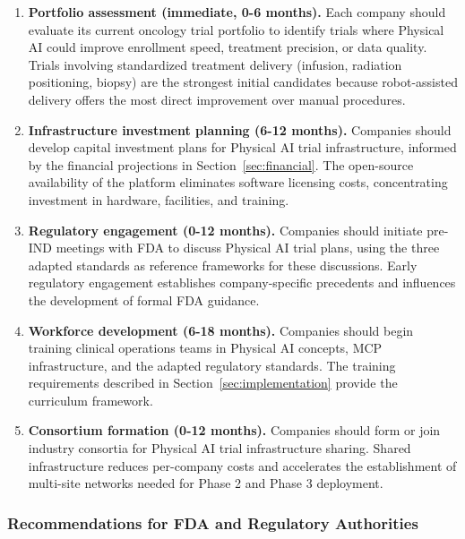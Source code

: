\begin{enumerate}[nosep]
  \item \textbf{Portfolio assessment (immediate, 0-6 months).} Each company
    should evaluate its current oncology trial portfolio to identify trials
    where Physical AI could improve enrollment speed, treatment precision, or
    data quality. Trials involving standardized treatment delivery (infusion,
    radiation positioning, biopsy) are the strongest initial candidates
    because robot-assisted delivery offers the most direct improvement over
    manual procedures.

  \item \textbf{Infrastructure investment planning (6-12 months).} Companies
    should develop capital investment plans for Physical AI trial
    infrastructure, informed by the financial projections in
    Section~\ref{sec:financial}. The open-source availability of the platform
    \cite{main-repo, mcp-repo, fl-repo} eliminates software licensing costs,
    concentrating investment in hardware, facilities, and training.

  \item \textbf{Regulatory engagement (0-12 months).} Companies should
    initiate pre-IND meetings with FDA to discuss Physical AI trial plans,
    using the three adapted standards \cite{ich-adapt, cfr50-adapt,
    cfr312-adapt} as reference frameworks for these discussions. Early
    regulatory engagement establishes company-specific precedents and
    influences the development of formal FDA guidance.

  \item \textbf{Workforce development (6-18 months).} Companies should begin
    training clinical operations teams in Physical AI concepts, MCP
    infrastructure, and the adapted regulatory standards. The training
    requirements described in Section~\ref{sec:implementation} provide the
    curriculum framework.

  \item \textbf{Consortium formation (0-12 months).} Companies should form
    or join industry consortia for Physical AI trial infrastructure sharing.
    Shared infrastructure reduces per-company costs and accelerates the
    establishment of multi-site networks needed for Phase 2 and Phase 3
    deployment.
\end{enumerate}

\subsubsection{Recommendations for FDA and Regulatory Authorities}

